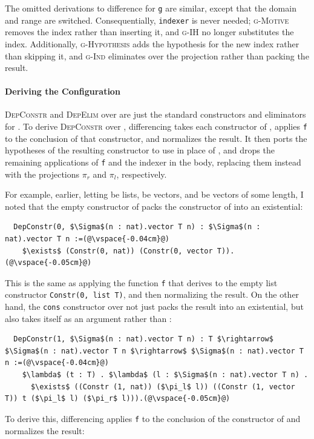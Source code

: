 The omitted derivations to difference for \lstinline{g} are similar,
except that the domain and range are switched. Consequentially, \lstinline{indexer} is never needed;
\textsc{g-Motive} removes the index rather than inserting it, and \textsc{g-IH} no longer substitutes the index.
Additionally, \textsc{g-Hypothesis} adds the hypothesis for the new index
rather than skipping it, and \textsc{g-Ind} eliminates over the projection rather than packing the result. %

\paragraph{Deriving the Configuration}
\textsc{DepConstr} and \textsc{DepElim} over \Aa are just the standard constructors and eliminators for \Aa.
To derive \textsc{DepConstr} over \B, differencing takes each constructor of \Aa,
applies \lstinline{f} to the conclusion of that constructor, and normalizes the result. %
It then ports the hypotheses of the resulting constructor to use \B in place of \Aa, and drops the remaining applications of \lstinline{f}
and the indexer in the body, replacing them instead with the projections $\pi_r$ and $\pi_l$, respectively.

For example, earlier, letting \Aa be lists, \AI be vectors, and \B be vectors of some length,
I noted that the empty constructor of \B packs the constructor of \AI into an existential:

\begin{lstlisting}
  DepConstr(0, $\Sigma$(n : nat).vector T n) : $\Sigma$(n : nat).vector T n :=(@\vspace{-0.04cm}@)
    $\exists$ (Constr(0, nat)) (Constr(0, vector T)).(@\vspace{-0.05cm}@)
\end{lstlisting}
This is the same as applying the function \lstinline{f} that \toolnamec derives to the empty list constructor 
\lstinline{Constr(0, list T)}, and then normalizing the result.
On the other hand, the \lstinline{cons} constructor over \B not just packs the result into an existential,
but also takes \B itself as an argument rather than \Aa:

\begin{lstlisting}
  DepConstr(1, $\Sigma$(n : nat).vector T n) : T $\rightarrow$ $\Sigma$(n : nat).vector T n $\rightarrow$ $\Sigma$(n : nat).vector T n :=(@\vspace{-0.04cm}@)
    $\lambda$ (t : T) . $\lambda$ (l : $\Sigma$(n : nat).vector T n) .
      $\exists$ ((Constr (1, nat)) ($\pi_l$ l)) ((Constr (1, vector T)) t ($\pi_l$ l) ($\pi_r$ l))).(@\vspace{-0.05cm}@)
\end{lstlisting}
To derive this, differencing applies \lstinline{f} to the conclusion of the constructor of \Aa and normalizes the result:

